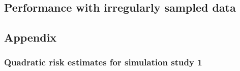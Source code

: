 \documentclass[12pt]{article}
\theoremstyle{definition}
\begin{document}
\bigskip



\subsection{Performance with irregularly sampled data}



\bigskip
\setlength{\dashlinedash}{0.5pt}
\setlength{\dashlinegap}{1pt}
\setlength{\arrayrulewidth}{0.2pt}
%










\subsection{Appendix}

\subsubsection{Quadratic risk estimates for simulation study 1}





\end{document}
